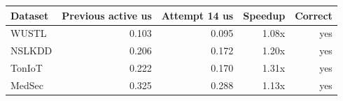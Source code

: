 \begin{tabular}{lrrrr}
\toprule
Dataset & Previous active us & Attempt 14 us & Speedup & Correct \\
\midrule
WUSTL & 0.103 & 0.095 & 1.08x & yes \\
NSLKDD & 0.206 & 0.172 & 1.20x & yes \\
TonIoT & 0.222 & 0.170 & 1.31x & yes \\
MedSec & 0.325 & 0.288 & 1.13x & yes \\
\bottomrule
\end{tabular}
